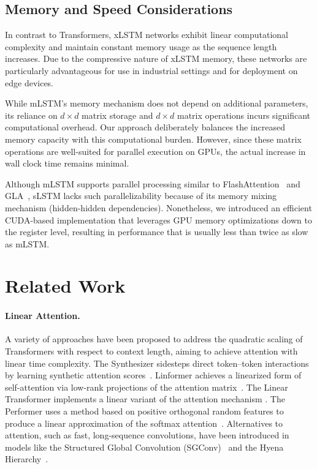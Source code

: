 \subsection{Memory and Speed Considerations}

In contrast to Transformers, xLSTM networks exhibit linear computational complexity and maintain constant memory usage as the sequence length increases. Due to the compressive nature of xLSTM memory, these networks are particularly advantageous for use in industrial settings and for deployment on edge devices.

While mLSTM’s memory mechanism does not depend on additional parameters, its reliance on $d \times d$ matrix storage and $d \times d$ matrix operations incurs significant computational overhead. Our approach deliberately balances the increased memory capacity with this computational burden. However, since these matrix operations are well-suited for parallel execution on GPUs, the actual increase in wall clock time remains minimal.

Although mLSTM supports parallel processing similar to FlashAttention~\citep{Dao:22,Dao:23} and GLA~\citep{Yang:23arxiv}, sLSTM lacks such parallelizability because of its memory mixing mechanism (hidden-hidden dependencies). Nonetheless, we introduced an efficient CUDA-based implementation that leverages GPU memory optimizations down to the register level, resulting in performance that is usually less than twice as slow as mLSTM.

\section{Related Work}
\label{sec:related}

\paragraph{Linear Attention.} A variety of approaches have been proposed to address the quadratic scaling of Transformers with respect to context length, aiming to achieve attention with linear time complexity. The Synthesizer sidesteps direct token--token interactions by learning synthetic attention scores~\citep{Tay:20arxiv}. Linformer achieves a linearized form of self-attention via low-rank projections of the attention matrix~\citep{Wang:20arxiv}. The Linear Transformer implements a linear variant of the attention mechanism \citep{Katharopoulos:20}. The Performer uses a method based on positive orthogonal random features to produce a linear approximation of the softmax attention~\citep{Choromanski:21}. Alternatives to attention, such as fast, long-sequence convolutions, have been introduced in models like the Structured Global Convolution (SGConv)~\citep{Li:22} and the Hyena Hierarchy~\citep{Poli:23}.

